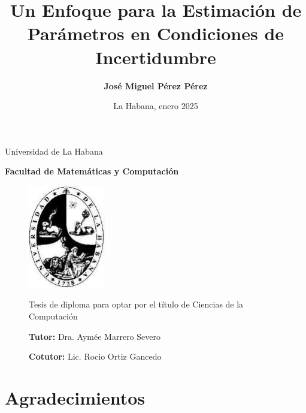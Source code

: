 \documentclass{article}
\begin{document}
\begin{center}
Universidad de La Habana

\textbf{Facultad de Matemáticas y Computación}
\end{center}

\begin{figure}[htbp]
\centering
\includegraphics[width=0.3\textwidth]{images/Universidad_De_La_Habana.jpg}

    \title{ \textbf{ Un Enfoque para la Estimación de Parámetros en Condiciones de Incertidumbre }}
    \begin{center}
        \large    Tesis de diploma para optar por el título de Ciencias de la Computación
    \end{center}
    \author{ \textbf{ José Miguel Pérez Pérez }}
    \date{}
    \maketitle

    \begin{center}

    \textbf{Tutor:}
    \hspace{ 1pt } Dra. Aymée Marrero Severo

    \textbf{Cotutor:}
    \hspace{ 1pt } Lic. Rocio Ortiz Gancedo

    \end{center}

\end{figure}

\begin{center}
\date{ La Habana, enero 2025}
\end{center}

\newpage

\section*{ \textbf{ Agradecimientos } }
\end{document}
